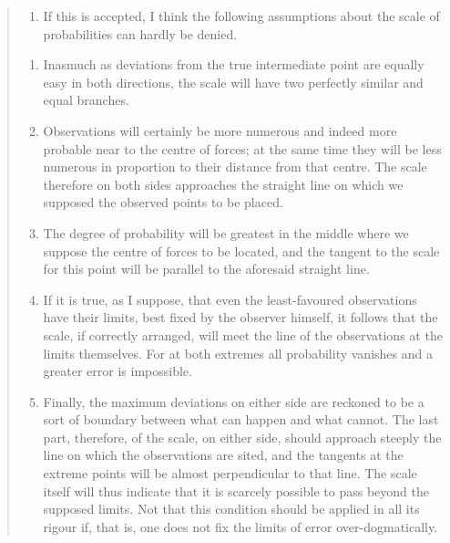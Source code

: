 \documentclass[
]{article}
\providecommand{\tightlist}{%
  \setlength{\itemsep}{0pt}\setlength{\parskip}{0pt}}
\begin{document}
\begin{quote}
\begin{enumerate}
\def\labelenumi{\arabic{enumi}.}
\setcounter{enumi}{6}
\tightlist
\item
  If this is accepted, I think the following assumptions about the scale
  of probabilities can hardly be denied.
\end{enumerate}

\begin{enumerate}
\def\labelenumi{(\alph{enumi})}
\tightlist
\item
  Inasmuch as deviations from the true intermediate point are equally
  easy in both directions, the scale will have two perfectly similar and
  equal branches.
\item
  Observations will certainly be more numerous and indeed more probable
  near to the centre of forces; at the same time they will be less
  numerous in proportion to their distance from that centre. The scale
  therefore on both sides approaches the straight line on which we
  supposed the observed points to be placed.
\item
  The degree of probability will be greatest in the middle where we
  suppose the centre of forces to be located, and the tangent to the
  scale for this point will be parallel to the aforesaid straight line.
\item
  If it is true, as I suppose, that even the least-favoured observations
  have their limits, best fixed by the observer himself, it follows that
  the scale, if correctly arranged, will meet the line of the
  observations at the limits themselves. For at both extremes all
  probability vanishes and a greater error is impossible.
\item
  Finally, the maximum deviations on either side are reckoned to be a
  sort of boundary between what can happen and what cannot. The last
  part, therefore, of the scale, on either side, should approach steeply
  the line on which the observations are sited, and the tangents at the
  extreme points will be almost perpendicular to that line. The scale
  itself will thus indicate that it is scarcely possible to pass beyond
  the supposed limits. Not that this condition should be applied in all
  its rigour if, that is, one does not fix the limits of error
  over-dogmatically.
\end{enumerate}
\end{quote}
\end{document}
